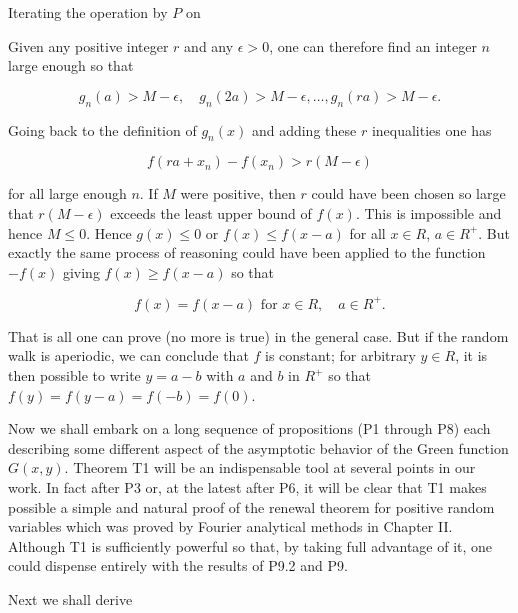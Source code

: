 Iterating the operation by $P$ on

Given any positive integer $r$ and any $\epsilon > 0$, one can therefore find an integer $n$ large enough so that

$$g_n(a) > M - \epsilon, \quad g_n(2a) > M - \epsilon, \dots, g_n(ra) > M - \epsilon.$$

Going back to the definition of $g_n(x)$ and adding these $r$ inequalities one has

$$f(ra + x_n) - f(x_n) > r(M - \epsilon)$$

for all large enough $n$. If $M$ were positive, then $r$ could have been chosen so large that $r(M - \epsilon)$ exceeds the least upper bound of $f(x)$. This is impossible and hence $M \leq 0$. Hence $g(x) \leq 0$ or $f(x) \leq f(x - a)$ for all $x \in R$, $a \in R^+$. But exactly the same process of reasoning could have been applied to the function $-f(x)$ giving $f(x) \geq f(x - a)$ so that

$$f(x) = f(x - a) \text{ for } x \in R, \quad a \in R^+.$$

That is all one can prove (no more is true) in the general case. But if the random walk is aperiodic, we can conclude that $f$ is constant; for arbitrary $y \in R$, it is then possible to write $y = a - b$ with $a$ and $b$ in $R^+$ so that $f(y) = f(y - a) = f(-b) = f(0)$.

Now we shall embark on a long sequence of propositions (P1 through P8) each describing some different aspect of the asymptotic behavior of the Green function $G(x,y)$. Theorem T1 will be an indispensable tool at several points in our work. In fact after P3 or, at the latest after P6, it will be clear that T1 makes possible a simple and natural proof of the renewal theorem for positive random variables which was proved by Fourier analytical methods in Chapter II. Although T1 is sufficiently powerful so that, by taking full advantage of it, one could dispense entirely with the results of P9.2 and P9.

Next we shall derive